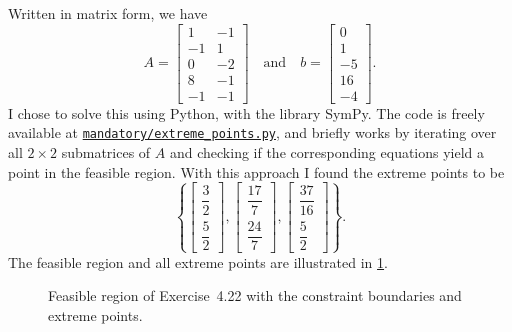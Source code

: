 \documentclass[
  a4paper,
  12pt,
]{article}
\numberwithin{equation}{section}
\begin{document}
\begin{solution}
  Written in matrix form, we have
  \begin{equation}
    A =
    \begin{bmatrix}
      1 & -1 \\
      -1 & 1 \\
      0 & -2 \\
      8 & -1 \\
      -1 & -1
    \end{bmatrix}
    \quad\text{and}\quad
    b =
    \begin{bmatrix}
      0 \\
      1 \\
      -5 \\
      16 \\
      -4
    \end{bmatrix}.
  \end{equation}
  I chose to solve this using Python, with the library SymPy.
  The code is freely available at \href{https://github.com/augustfe/MAT4120/blob/main/mandatory/extreme_points.py}{\texttt{mandatory/extreme\_points.py}}, and briefly works by iterating over all $2 \times 2$ submatrices of $A$ and checking if the corresponding equations yield a point in the feasible region.
  With this approach I found the extreme points to be
  \begin{equation}
    \left\{
      \begin{bmatrix} \dfrac{3}{2} \\ \dfrac{5}{2}
      \end{bmatrix},
      \begin{bmatrix} \dfrac{17}{7} \\ \dfrac{24}{7}
      \end{bmatrix},
      \begin{bmatrix} \dfrac{37}{16} \\ \dfrac{5}{2}
      \end{bmatrix}
    \right\}.
  \end{equation}
  The feasible region and all extreme points are illustrated in \cref{fig:exercise422-feasible-region}.

  \begin{figure}[h]
    \centering
    
    \caption{Feasible region of Exercise~4.22 with the constraint boundaries and extreme points.}\label{fig:exercise422-feasible-region}
  \end{figure}
\end{solution}
\end{document}
